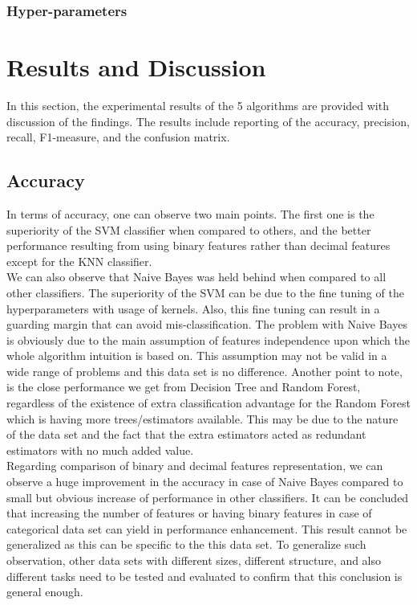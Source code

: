 \documentclass{article}
\begin{document}
\subsubsection*{Hyper-parameters}


\newpage
\section{Results and Discussion}
In this section, the experimental results of the 5 algorithms are provided with discussion of the findings. The results include reporting of the accuracy, precision, recall, F1-measure, and the confusion matrix. 

\subsection{Accuracy}
In terms of accuracy, one can observe two main points. The first one is the superiority of the SVM classifier when compared to others, and the better performance resulting from using binary features rather than decimal features except for the KNN classifier. \\
\indent We can also observe that Naive Bayes was held behind when compared to all other classifiers. The superiority of the SVM can be due to the fine tuning of the hyperparameters with usage of kernels. Also, this fine tuning can result in a guarding margin that can avoid mis-classification. The problem with Naive Bayes is obviously due to the main assumption of features independence upon which the whole algorithm intuition is based on. This assumption may not be valid in a wide range of problems and this data set is no difference. Another point to note, is the close performance we get from Decision Tree and Random Forest, regardless of the existence of extra classification advantage for the Random Forest which is having more trees/estimators available. This may be due to the nature of the data set and the fact that the extra estimators acted as redundant estimators with no much added value. \\
\indent Regarding comparison of binary and decimal features representation, we can observe a huge improvement in the accuracy in case of Naive Bayes compared to small but obvious increase of performance in other classifiers. It can be concluded that increasing the number of features or having binary features in case of categorical data set can yield in performance enhancement. This result cannot be generalized as this can be specific to the this data set. To generalize such observation, other data sets with different sizes, different structure, and also different tasks need to be tested and evaluated to confirm that this conclusion is general enough.
\end{document}
